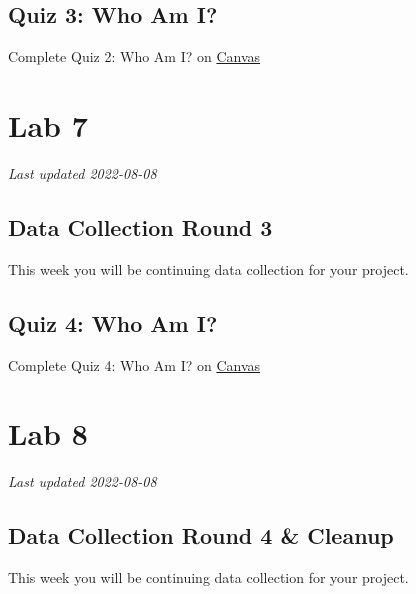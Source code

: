 \documentclass[
]{book}
\begin{document}
\hypertarget{quiz-3-who-am-i}{%
\chapter*{Quiz 3: Who Am I?}\label{quiz-3-who-am-i}}

Complete Quiz 2: Who Am I? on \href{https://canvas.ubc.ca/courses/113910}{Canvas}

\hypertarget{part-lab-7}{%
\part*{Lab 7}\label{part-lab-7}}

\emph{Last updated 2022-08-08}

\hypertarget{data-collection-round-3}{%
\chapter*{Data Collection Round 3}\label{data-collection-round-3}}

This week you will be continuing data collection for your project.

\hypertarget{quiz-4-who-am-i}{%
\chapter*{Quiz 4: Who Am I?}\label{quiz-4-who-am-i}}

Complete Quiz 4: Who Am I? on \href{https://canvas.ubc.ca/courses/113910}{Canvas}

\hypertarget{part-lab-8}{%
\part*{Lab 8}\label{part-lab-8}}

\emph{Last updated 2022-08-08}

\hypertarget{data-collection-round-4-cleanup}{%
\chapter*{Data Collection Round 4 \& Cleanup}\label{data-collection-round-4-cleanup}}

This week you will be continuing data collection for your project.
\end{document}
